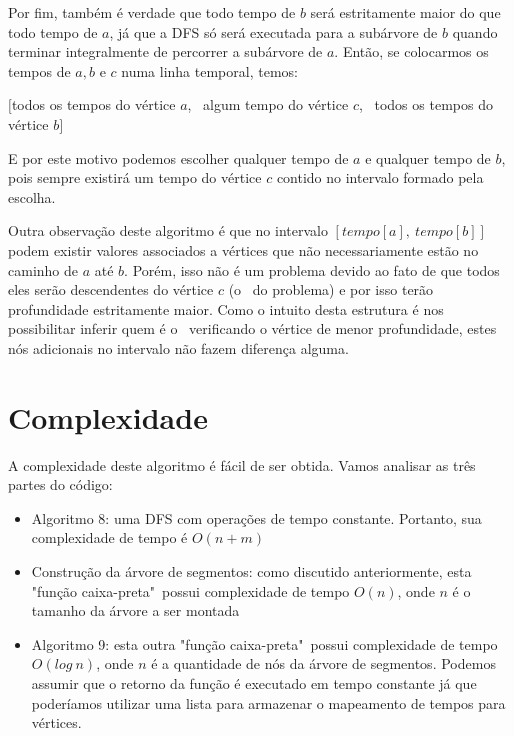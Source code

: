 Por fim, também é verdade que todo tempo de $b$ será estritamente maior do que todo tempo de $a$, já que a DFS só será executada para a subárvore de $b$ quando terminar integralmente de percorrer a subárvore de $a$. Então, se colocarmos os tempos de $a, b$ e $c$ numa linha temporal, temos:

\begin{center}
    $[$todos os tempos do vértice $a$, \ algum tempo do vértice $c$, \ todos os tempos do vértice $b]$
\end{center}

E por este motivo podemos escolher qualquer tempo de $a$ e qualquer tempo de $b$, pois sempre existirá um tempo do vértice $c$ contido no intervalo formado pela escolha.

\vspace{0.5cm}

Outra observação deste algoritmo é que no intervalo $[tempo[a],\ tempo[b]]$ podem existir valores associados a vértices que não necessariamente estão no caminho de $a$ até $b$. Porém, isso não é um problema devido ao fato de que todos eles serão descendentes do vértice $c$ (o \LCA\ do problema) e por isso terão profundidade estritamente maior. Como o intuito desta estrutura é nos possibilitar inferir quem é o \LCA\ verificando o vértice de menor profundidade, estes nós adicionais no intervalo não fazem diferença alguma.

\section{Complexidade}

A complexidade deste algoritmo é fácil de ser obtida. Vamos analisar as três partes do código:

\begin{itemize}
    \item Algoritmo 8: uma DFS com operações de tempo constante. Portanto, sua complexidade de tempo é $O(n+m)$
    \item Construção da árvore de segmentos: como discutido anteriormente, esta "função caixa-preta"\  possui complexidade de tempo $O(n)$, onde $n$ é o tamanho da árvore a ser montada
    \item Algoritmo 9: esta outra "função caixa-preta"\ possui complexidade de tempo $O(log\ n)$, onde $n$ é a quantidade de nós da árvore de segmentos. Podemos assumir que o retorno da função é executado em tempo constante já que poderíamos utilizar uma lista para armazenar o mapeamento de tempos para vértices.
\end{itemize}


